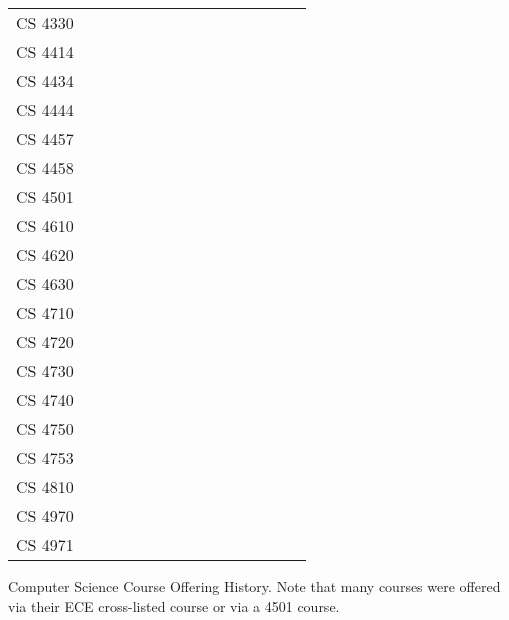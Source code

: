 \documentclass[10pt,letter,twocolumn]{book}
\begin{document}
{\begin{tabular}{l|cccccccccccccc}
CS 4330 &    & \X &    &    &    &    &    &    &    &    &    &    &    \\
CS 4414 & \X & \X & \X & \X & \X & \X & \X & \X & \X & \X & \X & \X & \X \\
CS 4434 &    &    &    & \X &    &    &    & \X &    &    &    &    &    \\
CS 4444 & \X &    & \X &    & \X &    & \X &    &    & \X &    &    &    \\
CS 4457 & \X & \X & \X & \X & \X & \X & \X & \X & \X & \X & \X &    & \X \\
CS 4458 & \X &    &    &    &    &    &    &    &    &    &    &    &    \\
CS 4501 &    &    &    &    & \X & \X &    &    & \X & \X &    & \X & \X \\
CS 4610 &    &    & \X &    &    &    &    & \X &    &    &    & \X &    \\
CS 4620 &    &    &    &    &    &    &    &    &    &    & \X &    & \X \\
CS 4630 &    & \X & \X & \X &    & \X &    & \X &    & \X & \X & \X &    \\
CS 4710 &    & \X &    &    &    & \X &    & \X &    & \X &    & \X &    \\
CS 4720 &    &    & \X &    & \X &    & \X &    & \X &    & \X & \X & \X \\
CS 4730 &    &    &    & \X &    &    & \X &    &    &    &    & \X &    \\
CS 4740 &    &    &    &    &    &    &    & \X &    & \X &    &    &    \\
CS 4750 & \X &    &    & \X &    & \X &    & \X &    & \X &    & \X &    \\
CS 4753 & \X &    & \X &    & \X &    & \X &    & \X &    & \X &    & \X \\
CS 4810 & \X &    &    & \X &    &    & \X &    & \X &    &    & \X & \X \\
CS 4970 &    &    &    &    &    &    &    & \X & \X &    & \X &    & \X \\
CS 4971 &    &    &    &    &    &    &    &    &    & \X &    & \X &    \\
\end{tabular}
}

\begin{table}[h!]
\begin{center}

{\resizebox{3.625in}{!}{\courseofferingtable}}
{\courseofferingtable}

\caption{Computer Science Course Offering History.  Note that many courses were offered via their ECE cross-listed course or via a 4501 course.}
\end{center}
\end{table}
\end{document}
